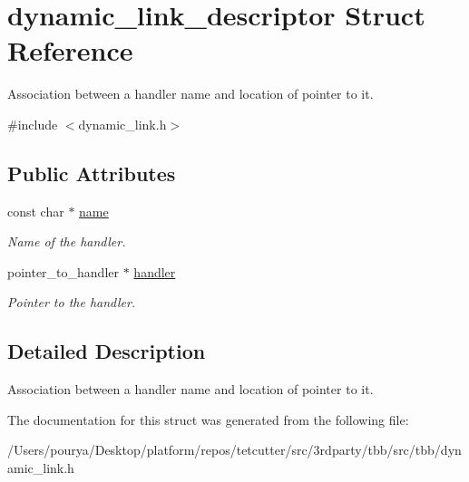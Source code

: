 \hypertarget{structdynamic__link__descriptor}{}\section{dynamic\+\_\+link\+\_\+descriptor Struct Reference}
\label{structdynamic__link__descriptor}


Association between a handler name and location of pointer to it.  




{\ttfamily \#include $<$dynamic\+\_\+link.\+h$>$}

\subsection*{Public Attributes}
\begin{DoxyCompactItemize}
\item 
\hypertarget{structdynamic__link__descriptor_a45c4a4684f69a28783fed7fc8bf92ded}{}const char $\ast$ \hyperlink{structdynamic__link__descriptor_a45c4a4684f69a28783fed7fc8bf92ded}{name}\label{structdynamic__link__descriptor_a45c4a4684f69a28783fed7fc8bf92ded}

\begin{DoxyCompactList}\small\item\em Name of the handler. \end{DoxyCompactList}\item 
\hypertarget{structdynamic__link__descriptor_a11964964baf1be8d33f8e0bc753880d8}{}pointer\+\_\+to\+\_\+handler $\ast$ \hyperlink{structdynamic__link__descriptor_a11964964baf1be8d33f8e0bc753880d8}{handler}\label{structdynamic__link__descriptor_a11964964baf1be8d33f8e0bc753880d8}

\begin{DoxyCompactList}\small\item\em Pointer to the handler. \end{DoxyCompactList}\end{DoxyCompactItemize}


\subsection{Detailed Description}
Association between a handler name and location of pointer to it. 

The documentation for this struct was generated from the following file\+:\begin{DoxyCompactItemize}
\item 
/\+Users/pourya/\+Desktop/platform/repos/tetcutter/src/3rdparty/tbb/src/tbb/dynamic\+\_\+link.\+h\end{DoxyCompactItemize}
